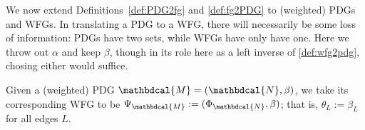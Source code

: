 \documentclass[letterpaper]{article} %
\theoremstyle{plain}
\theoremstyle{definition}
\theoremstyle{remark}
\newcommand{\dg}[1]{\mathbdcal{#1}}
\newcommand{\WFGof}[1]{\Psi_{{#1}}}
\newcommand{\FGof}[1]{\Phi_{{#1}}}
\begin{document}
We now extend Definitions~\ref{def:PDG2fg} and \ref{def:fg2PDG} to
(weighted) PDGs and WFGs.  
In translating a PDG to a WFG, 
there will necessarily be some loss of information: PDGs have two sets, while WFGs have 
only have one. Here we throw out $\alpha$ and keep $\beta$, 
though in its role here as a left inverse of \cref{def:wfg2pdg},
chosing either would suffice. 


\begin{defn}
Given a (weighted) PDG $\dg M =
(\dg N, \beta)$, we take its corresponding WFG to be $\WFGof{\dg M} :=
(\FGof{\dg N}, \beta)$; that is, $\theta_L := \beta_L$ for all edges $L$.
\end{defn}
\end{document}

